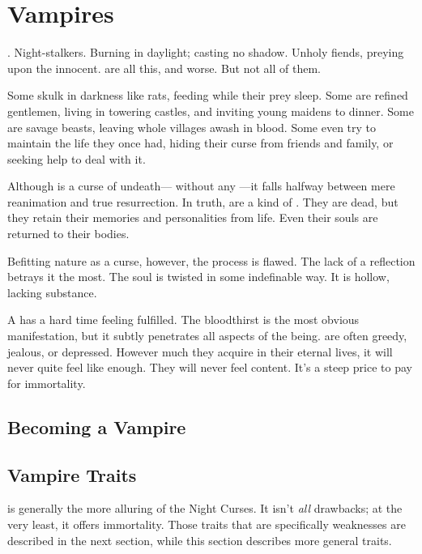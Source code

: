 \chapter{Vampires}

.
Night-stalkers.
Burning in daylight; casting no shadow.
Unholy fiends, preying upon the innocent.
\capital{\vampires} are all this, and worse.
But not all of them.

Some skulk in darkness like rats, feeding while their prey sleep.
Some are refined gentlemen, living in towering castles, and inviting young maidens to dinner.
Some are savage beasts, leaving whole villages awash in blood.
Some even try to maintain the life they once had, hiding their curse from friends and family, or seeking help to deal with it.

Although {\vampirism} is a curse of undeath--- without any ---it falls halfway between mere reanimation and true resurrection.
In truth, {\vampires} are a kind of .
They are dead, but they retain their memories and personalities from life.
Even their souls are returned to their bodies.

Befitting {\vampirismpossessive} nature as a curse, however, the process is flawed.
The lack of a reflection betrays it the most.
The {\vampirepossessive} soul is twisted in some indefinable way.
It is hollow, lacking substance.

A {\vampire} has a hard time feeling fulfilled.
The bloodthirst is the most obvious manifestation, but it subtly penetrates all aspects of the {\vampirepossessive} being.
\capital{\vampires} are often greedy, jealous, or depressed.
However much they acquire in their eternal lives, it will never quite feel like enough.
They will never feel content.
It's a steep price to pay for immortality.

\section{Becoming a Vampire}



\section{Vampire Traits}

\capital{\vampirism} is generally the more alluring of the Night Curses.
It isn't \emph{all} drawbacks; at the very least, it offers immortality.
Those traits that are specifically weaknesses are described in the next section, while this section describes more general traits.

